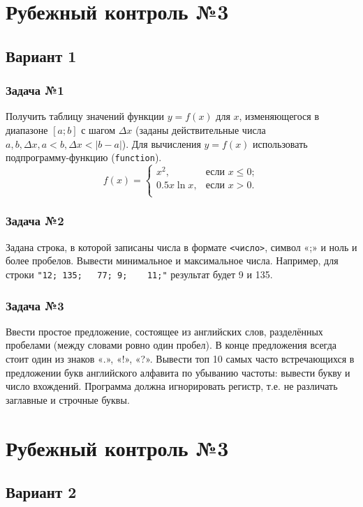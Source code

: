 \documentclass[12pt,a5paper,landscape]{report}
\begin{document}
\parindent=1cm
\pagestyle{empty}

\clearpage
\section*{Рубежный контроль №3}
\subsection*{Вариант 1}
\subsubsection*{Задача №1}
Получить таблицу значений функции $y=f(x)$ для $x$, изменяющегося в диапазоне $[a; b]$ с шагом $\Delta x$ (заданы действительные числа $a, b, \Delta x, a<b, \Delta x < |b-a|$). Для вычисления $y=f(x)$ использовать подпрограмму-функцию (\texttt{function}).
\begin{equation*}
f(x) = 
\begin{cases}
  x^2, &\text{если $x \le 0$};\\
  0.5 x \ln x, &\text{если $x > 0$}.\\
\end{cases}
\end{equation*}
\subsubsection*{Задача №2}
Задана строка, в которой записаны числа в формате \texttt{<число>}, символ «;» и ноль и более пробелов. Вывести минимальное и максимальное числа. Например, для строки \verb|"12; 135;   77; 9;    11;"| результат будет 9 и 135.
\subsubsection*{Задача №3}
Ввести простое предложение, состоящее из английских слов, разделённых пробелами (между словами ровно один пробел). В конце предложения всегда стоит один из знаков «.», «!», «?». Вывести топ 10 самых часто встречающихся в предложении букв английского алфавита по убыванию частоты: вывести букву и число вхождений. Программа должна игнорировать регистр, т.е. не различать заглавные и строчные буквы.

\section*{Рубежный контроль №3}
\subsection*{Вариант 2}
\end{document}

